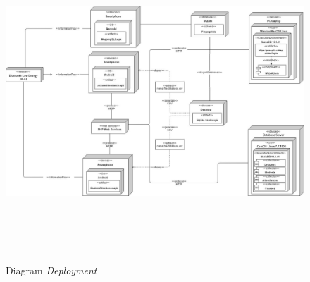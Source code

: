 \vspace{-0.2cm}
\begin{landscape}
	\begin{figure}[H]
		\center
		\includegraphics [width = 22.5cm, height=12cm]{gambar/model/deployment-diagram}
		\caption{Diagram \textit{Deployment}}
		\label{deployment-diagram}
	\end{figure}
\end{landscape}


